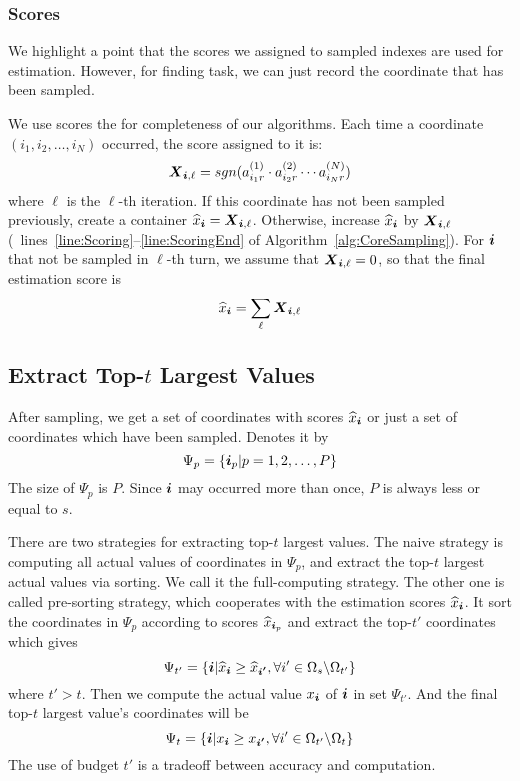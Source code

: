 \documentclass[letterpaper]{article}
\newcommand{\Sca}[3]{{#1}^{(#2)}_{i_#2#3}}%
\newcommand{\anr}[2]{\Sca{a}{#1}{#2}}
\newcommand{\score}[1]{\M{X}_{\V{i},#1}}
\newcommand{\V}[1]{{\bm{{\MakeLowercase{#1}}}}}
\newcommand{\M}[1]{{\bm{{\MakeUppercase{#1}}}}}
\newcommand{\AlgLines}[3]{lines~\ref{line:#2}--\ref{line:#3} of Algorithm~\ref{alg:#1}}
\newcommand{\coord}{(i_1,i_2,\ldots,i_N)}
\newcommand{\predx}{\widehat{x}_{\V{i}}}
\begin{document}
\subsubsection{Scores}
We highlight a point that the scores we assigned to sampled indexes are used for estimation.
However, for finding task, we can just record the coordinate that has been sampled.

We use scores the for completeness of our algorithms.
Each time a coordinate $\coord $ occurred, the score assigned to it is:
\[
\score{\ell}  = sgn(\anr{1}{r}\cdot\anr{2}{r}\cdots\anr{N}{r})
\]
where $\ell$ is the $\ell$-th iteration.
If this coordinate has not been sampled previously,
create a container $\predx = \score{\ell}$.
Otherwise, increase $\predx$ by $\score{\ell}$
(~\AlgLines{CoreSampling}{Scoring}{ScoringEnd}).
For $\V{i}$ that not be sampled in $\ell$-th turn,
we assume that $\score{\ell}=0$,
so that the final estimation score is
\begin{equation}\label{eq:score}
\predx = \sum_{\ell} \score{\ell}
\end{equation}

\subsection{Extract Top-$t$ Largest Values}
After sampling, we get a set of coordinates with scores $\predx$
or just a set of coordinates which have been sampled.
Denotes it by
\[
    \Psi_p = \{\V{i}_p|p = 1,2,\ldots,P\}
\]
The size of $\Psi_p$ is $P$.
Since $\V{i}$ may occurred more than once, $P$ is always less or equal to $s$.

There are two strategies for extracting top-$t$ largest values.
The naive strategy is computing all actual values of coordinates in $\Psi_p$,
and extract the top-$t$ largest actual values via sorting.
We call it the full-computing strategy.
The other one is called pre-sorting strategy,
which cooperates with the estimation scores $\predx$.
It sort the coordinates in $\Psi_p$ according to scores $\widehat{x}_{\V{i}_p}$
and extract the top-$t'$ coordinates which gives
\[
    \Psi_{t'} = \{ \V{i} | \predx \geq \widehat{x}_{\V{i'}},
                           \forall i'\in \Omega_{s} \backslash \Omega_{t'}
                \}
\]  where $t'>t$.
Then we compute the actual value $x_{\V{i}}$ of $\V{i}$ in set $\Psi_{t'}$.
And the final top-$t$ largest value's coordinates will be
\[
    \Psi_{t} =
                \{ \V{i} | x_{\V{i}}\geq x_{\V{i'}},
                           \forall i' \in \Omega_{t'} \backslash \Omega_{t}
                \}
\]
The use of budget $t'$ is a tradeoff between accuracy and computation.
\end{document}
